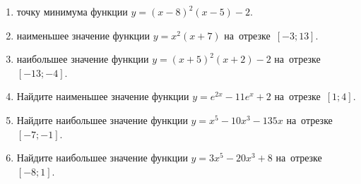 \documentclass[a4paper,10pt]{article}
\begin{document}
\begin{enumerate}
\item {} точку минимума функции $y=\left(x-8\right)^2\left(x-5\right)-2$.

\item {} наименьшее значение функции $y=x^2\left(x+7\right)$ на~отрезке~$\left[-3;13\right]$.

\item {} наибольшее значение функции $y=\left(x+5\right)^2\left(x+2\right)-2$ на~отрезке~$\left[-13;-4\right]$.

\item Найдите наименьшее значение функции $y=e^{2x}-11e^x+2$ на~отрезке~$\left[1;4\right]$.

\item Найдите наибольшее значение функции $y=x^5-10x^3-135x$ на~отрезке~$\left[-7;-1\right]$.

\item Найдите наибольшее значение функции $y=3x^5-20x^3+8$ на~отрезке~$\left[-8;1\right]$.

\end{enumerate}
\end{document}
